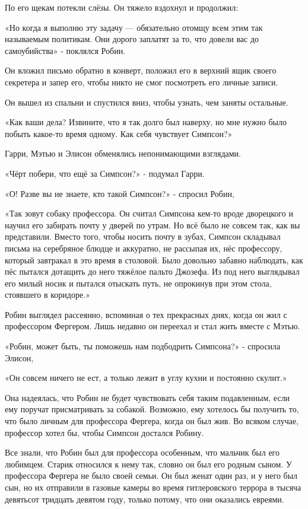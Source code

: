 \documentclass[a4paper,12pt]{book}
\begin{document}
\par
По его щекам потекли слёзы. Он тяжело вздохнул и продолжил:
\par
«Но когда я выполню эту задачу — обязательно отомщу всем этим так называемым политикам. Они дорого заплатят за то, что довели вас до самоубийства» - поклялся Робин.
\par
Он вложил письмо обратно в конверт, положил его в верхний ящик своего секретера и запер его, чтобы никто не смог посмотреть его личные записи.
\par
Он вышел из спальни и спустился вниз, чтобы узнать, чем заняты остальные.
\par
«Как ваши дела? Извините, что я так долго был наверху, но мне нужно было побыть какое-то время одному. Как себя чувствует Симпсон?»
\par
Гарри, Мэтью и Элисон обменялись непонимающими взглядами.
\par
«Чёрт побери, что ещё за Симпсон?» - подумал Гарри.
\par
«О! Разве вы не знаете, кто такой Симпсон?» - спросил Робин,
\par
«Так зовут собаку профессора. Он считал Симпсона кем-то вроде дворецкого и научил его забирать почту у дверей по утрам. Но всё было не совсем так, как вы представили. Вместо того, чтобы носить почту в зубах, Симпсон складывал письма на серебряное блюдце и аккуратно, не рассыпая их, нёс профессору, который завтракал в это время в столовой. Было довольно забавно наблюдать, как пёс пытался дотащить до него тяжёлое пальто Джозефа. Из под него выглядывал его милый носик и пытался отыскать путь, не опрокинув при этом стола, стоявшего в коридоре.»
\par
Робин выглядел рассеянно, вспоминая о тех прекрасных днях, когда он жил с профессором Фергером. Лишь недавно он переехал и стал жить вместе с Мэтью.\\
\par
«Робин, может быть, ты поможешь нам подбодрить Симпсона?» - спросила Элисон,
\par
«Он совсем ничего не ест, а только лежит в углу кухни и постоянно скулит.»
\par
Она надеялась, что Робин не будет чувствовать себя таким подавленным, если ему поручат присматривать за собакой. Возможно, ему хотелось бы получить то, что было личным для профессора Фергера, когда он был жив. Во всяком случае, профессор хотел бы, чтобы Симпсон достался Робину.
\par
Все знали, что Робин был для профессора особенным, что мальчик был его любимцем. Старик относился к нему так, словно он был его родным сыном. У профессора Фергера не было своей семьи. Он был женат один раз, и у него был сын, но их отправили в газовые камеры во время гитлеровского террора в тысяча девятьсот тридцать девятом году, только потому, что они оказались евреями.
\end{document}

